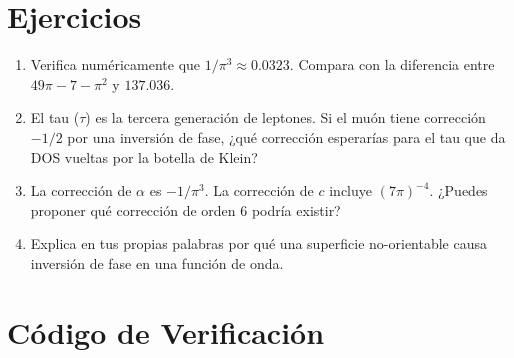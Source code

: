 \section*{Ejercicios}

\begin{enumerate}
    \item Verifica numéricamente que $1/\pi^3 \approx 0.0323$.
    Compara con la diferencia entre $49\pi - 7 - \pi^2$ y $137.036$.

    \item El tau ($\tau$) es la tercera generación de leptones.
    Si el muón tiene corrección $-1/2$ por una inversión de fase,
    ¿qué corrección esperarías para el tau que da DOS vueltas
    por la botella de Klein?

    \item La corrección de $\alpha$ es $-1/\pi^3$.
    La corrección de $c$ incluye $(7\pi)^{-4}$.
    ¿Puedes proponer qué corrección de orden 6 podría existir?

    \item Explica en tus propias palabras por qué una superficie
    no-orientable causa inversión de fase en una función de onda.
\end{enumerate}


\section*{Código de Verificación}

